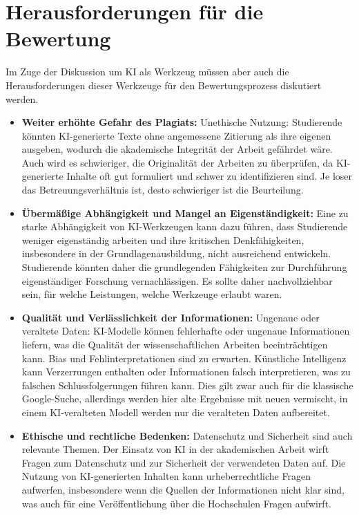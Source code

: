 \documentclass[conference]{IEEEtran}
\begin{document}
\section{Herausforderungen für die Bewertung}

Im Zuge der Diskussion um KI als Werkzeug müssen aber auch die Herausforderungen dieser Werkzeuge für den Bewertungsprozess diskutiert werden.

\begin{itemize}[leftmargin=*]
    \item \textbf{Weiter erhöhte Gefahr des Plagiats:}
    \newline Unethische Nutzung: Studierende könnten KI-generierte Texte ohne angemessene Zitierung als ihre eigenen ausgeben, wodurch die akademische Integrität der Arbeit gefährdet wäre.
    \newline Auch wird es schwieriger, die Originalität der Arbeiten zu überprüfen, da KI-generierte Inhalte oft gut formuliert und schwer zu identifizieren sind. Je loser das Betreuungsverhältnis ist, desto schwieriger ist die Beurteilung. 

    \item \textbf{Übermäßige Abhängigkeit und Mangel an Eigenständigkeit:}
    \newline Eine zu starke Abhängigkeit von KI-Werkzeugen kann dazu führen, dass Studierende weniger eigenständig arbeiten und ihre kritischen Denkfähigkeiten, insbesondere in der Grundlagenausbildung, nicht ausreichend entwickeln.
    \newline Studierende könnten daher die grundlegenden Fähigkeiten zur Durchführung eigenständiger Forschung vernachlässigen. Es sollte daher nachvollziehbar sein, für welche Leistungen, welche Werkzeuge erlaubt waren.

    \item \textbf{Qualität und Verlässlichkeit der Informationen:}
    \newline Ungenaue oder veraltete Daten: KI-Modelle können fehlerhafte oder ungenaue Informationen liefern, was die Qualität der wissenschaftlichen Arbeiten beeinträchtigen kann.
    \newline Bias und Fehlinterpretationen sind zu erwarten. Künstliche Intelligenz kann Verzerrungen enthalten oder Informationen falsch interpretieren, was zu falschen Schlussfolgerungen führen kann.  Dies gilt zwar auch für die klassische Google-Suche, allerdings werden hier alte Ergebnisse mit neuen vermischt, in einem KI-veralteten Modell werden nur die veralteten Daten aufbereitet. 

    \item \textbf{Ethische und rechtliche Bedenken:}
    \newline Datenschutz und Sicherheit sind auch relevante Themen. Der Einsatz von KI in der akademischen Arbeit wirft Fragen zum Datenschutz und zur Sicherheit der verwendeten Daten auf.
    \newline Die Nutzung von KI-generierten Inhalten kann urheberrechtliche Fragen aufwerfen, insbesondere wenn die Quellen der Informationen nicht klar sind, was auch für eine Veröffentlichung über die Hochschulen Fragen aufwirft.
\end{itemize}
\end{document}
